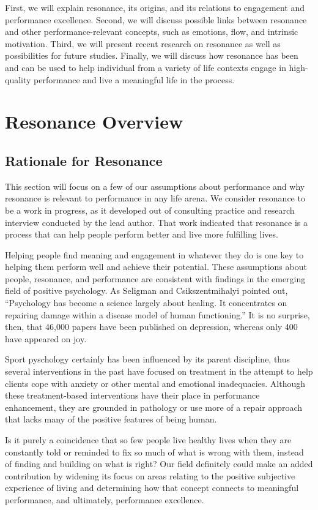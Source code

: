 \documentclass[ebook,12pt,oneside,openany]{memoir}
\begin{document}
First, we will explain resonance, its origins, and its relations to engagement and performance excellence.
Second, we will discuss possible links between resonance and other performance-relevant concepts, such as emotions, flow, and intrinsic motivation.
Third, we will present recent research on resonance as well as possibilities for future studies.
Finally, we will discuss how resonance has been and can be used to help individual from a variety of life contexts engage in high-quality performance and live a meaningful life in the process.

\section{Resonance Overview}
\subsection{Rationale for Resonance}
This section will focus on a few of our assumptions about performance and why resonance is relevant to performance in any life arena.
We consider resonance to be a work in progress, as it developed out of consulting practice and research interview conducted by the lead author.
That work indicated that resonance is a process that can help people perform better and live more fulfilling lives.

Helping people find meaning and engagement in whatever they do is one key to helping them perform well and achieve their potential.
These assumptions about people, resonance, and performance are consistent with findings in the emerging field of positive psychology.
As Seligman and Csikszentmihalyi pointed out, ``Psychology has become a science largely about healing. It concentrates on repairing damage within a disease model of human functioning.''
It is no surprise, then, that 46,000 papers have been published on depression, whereas only 400 have appeared on joy.

Sport pyschology certainly has been influenced by its parent discipline, thus several interventions in the past have focused on treatment in the attempt to help clients cope with anxiety or other mental and emotional inadequacies.
Although these treatment-based interventions have their place in performance enhancement, they are grounded in pathology or use more of a repair approach that lacks many of the positive features of being human.

Is it purely a coincidence that so few people live healthy lives when they are constantly told or reminded to fix so much of what is wrong with them, instead of finding and building on what is right?
Our field definitely could make an added contribution by widening its focus on areas relating to the positive subjective experience of living and determining how that concept connects to meaningful performance,
and ultimately, performance excellence.
\end{document}
